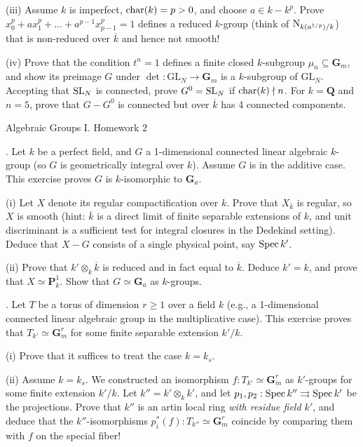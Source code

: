 \documentclass[10pt]{amsart}
\def\Spec{\mathop{\rm Spec}}
\begin{document}
(iii) Assume $k$ is imperfect, ${\rm{char}}(k) = p > 0$, and choose
$a \in k - k^p$.  Prove $x_0^p + a x_1^p + \dots + a^{p-1} x_{p-1}^p = 1$
defines a reduced $k$-group (think of ${\rm{N}}_{k(a^{1/p})/k}$)
that is non-reduced over $\overline{k}$ and hence not smooth!

(iv) Prove that the condition $t^n = 1$ defines a finite closed $k$-subgroup
$\mu_n \subseteq {\mathbf{G}}_m$, and show its preimage $G$ under $\det:\text{GL}_N \rightarrow {\mathbf{G}}_m$
is a $k$-subgroup of $\text{GL}_N$.  Accepting that
${\rm{SL}}_N$ is connected, prove $G^0 = {\rm{SL}}_N$ if ${\rm{char}}(k)\nmid n$.  For $k = \mathbf{Q}$ and $n = 5$,
prove that $G - G^0$ is connected but over $\overline{k}$ has 4 connected components. 

\newpage

\centerline{\sc Algebraic Groups I. Homework 2}
\medskip\medskip

\medskip{}.  Let $k$ be a perfect 
field, and $G$ a 1-dimensional connected linear algebraic $k$-group (so $G$ is geometrically
integral over $k$).   Assume $G$ is in the additive case.  This exercise proves
$G$ is $k$-isomorphic to $\mathbf{G}_a$.

(i)  Let $X$ denote its regular compactification over $k$.  
Prove that $X_{\overline{k}}$
is regular, so $X$ is smooth (hint: $\overline{k}$ is a direct limit of finite separable
extensions of $k$, and unit discriminant is a sufficient test for integral closures in the
Dedekind setting).  Deduce that $X - G$ consists of a single physical point, say
$\Spec k'$.

(ii) Prove that $k' \otimes_k \overline{k}$ is reduced
and in fact equal to $\overline{k}$.  Deduce $k' = k$, and prove that $X \simeq
{\mathbf{P}}^1_k$.  Show that $G \simeq \mathbf{G}_a$ as $k$-groups.

\medskip{}. Let $T$ be a torus of dimension $r \ge 1$
over a field $k$ (e.g., a 1-dimensional connected linear algebraic group in
the multiplicative case).  This exercise proves that $T_{k'} \simeq \mathbf{G}_m^r$ 
for some finite separable extension $k'/k$.

(i) Prove that it suffices to treat the case $k = k_s$.

(ii) Assume $k = k_s$.  We constructed an isomorphism
$f:T_{k'} \simeq {\mathbf{G}}_m^r$ as $k'$-groups for some finite extension $k'/k$.
Let $k'' = k' \otimes_k k'$, and let $p_1, p_2:\Spec k'' \rightrightarrows \Spec k'$ be the
projections.  Prove that $k''$ is an artin local ring {\em with residue field $k'$},
and deduce that the $k''$-isomorphisms $p_i^{\ast}(f):T_{k''} \simeq {\mathbf{G}}_m^r$
coincide by comparing them with $f$ on the special fiber!
\end{document}
